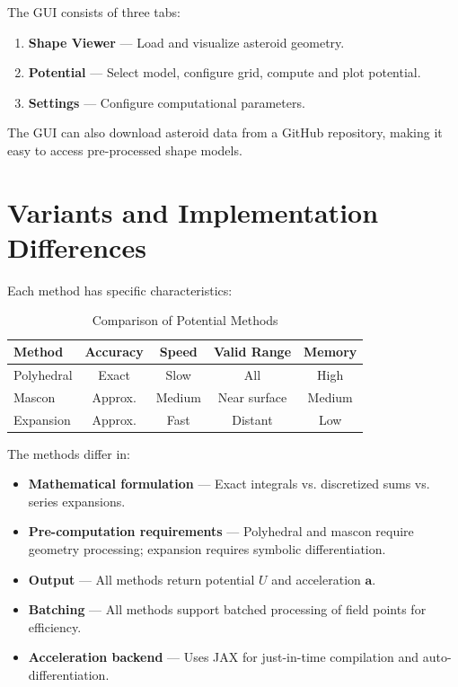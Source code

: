 \documentclass[a4paper,12pt]{article}
\begin{document}
The GUI consists of three tabs:
\begin{enumerate}
    \item \textbf{Shape Viewer} — Load and visualize asteroid geometry.
    \item \textbf{Potential} — Select model, configure grid, compute and plot potential.
    \item \textbf{Settings} — Configure computational parameters.
\end{enumerate}

The GUI can also download asteroid data from a GitHub repository, making it easy to access pre-processed shape models.

\section{Variants and Implementation Differences}

Each method has specific characteristics:

\begin{table}[htbp]
\centering
\begin{tabular}{|l|c|c|c|c|}
\hline
Method & Accuracy & Speed & Valid Range & Memory \\
\hline
Polyhedral & Exact & Slow & All & High \\
Mascon & Approx. & Medium & Near surface & Medium \\
Expansion & Approx. & Fast & Distant & Low \\
\hline
\end{tabular}
\caption{Comparison of Potential Methods}
\label{tab:comparison}
\end{table}

The methods differ in:
\begin{itemize}
    \item \textbf{Mathematical formulation} — Exact integrals vs. discretized sums vs. series expansions.
    \item \textbf{Pre-computation requirements} — Polyhedral and mascon require geometry processing; expansion requires symbolic differentiation.
    \item \textbf{Output} — All methods return potential $U$ and acceleration $\mathbf{a}$.
    \item \textbf{Batching} — All methods support batched processing of field points for efficiency.
    \item \textbf{Acceleration backend} — Uses JAX for just-in-time compilation and auto-differentiation.
\end{itemize}
\end{document}
